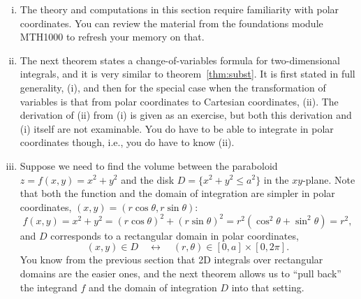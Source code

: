 \begin{remark}
\begin{enumerate}[(i)]
	\item The theory and computations in this section require familiarity with polar coordinates. You can review the material from the foundations module MTH1000 to refresh your memory on that.
	\item The next theorem states a change-of-variables formula for two-dimensional integrals, and it is very similar to theorem~\ref{thm:subst}. It is first stated in full generality, (i), and then for the special case when the transformation of variables is that from polar coordinates to Cartesian coordinates, (ii). The derivation of (ii) from (i) is given as an exercise, but both this derivation and (i) itself are not examinable. You do have to be able to integrate in polar coordinates though, i.e., you do have to know (ii).
	\item Suppose we need to find the volume between the paraboloid $z=f(x,y)=x^2+y^2$ and the disk $D= \{x^2+y^2 \leq a^2\}$ in the $xy$-plane. Note that both the function and the domain of integration are simpler in polar coordinates, $(x,y)=(r\cos\theta,r\sin\theta)$:
	\[ f(x,y) = x^2+y^2=(r\cos\theta)^2+(r\sin\theta)^2 
		= r^2 \left( \cos^2\theta + \sin^2\theta \right) = r^2, \]
	and $D$ corresponds to a rectangular domain in polar coordinates,
	\[ (x,y) \in D \quad \leftrightarrow \quad (r,\theta) \in [0,a]\times[0,2\pi]. \]
	You know from the previous section that 2D integrals over rectangular domains are the easier ones, and the next theorem allows us to ``pull back'' the integrand $f$ and the domain of integration $D$ into that setting. 
\end{enumerate}
\end{remark}

